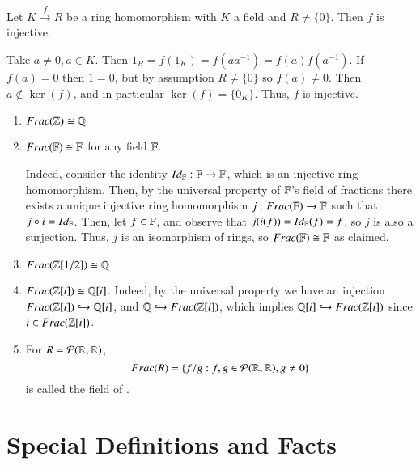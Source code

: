 \documentclass[12pt, a4paper, twoside, openright, titlepage]{book}
\begin{document}
\begin{lem}{}{}
    Let $K\xrightarrow{f} R$ be a ring homomorphism with $K$ a field and $R \neq \{0\}$. Then $f$ is injective.
    \begin{proof*}{}{}
        Take $a \neq 0, a \in K$. Then $1_R = f(1_K) = f(aa^{-1}) = f(a)f(a^{-1})$. If $f(a) = 0$ then $1 = 0$, but by assumption $R \neq \{0\}$ so $f(a) \neq 0$. Then $a \notin \ker(f)$, and in particular $\ker(f) = \{0_K\}$. Thus, $f$ is injective.
    \end{proof*}
\end{lem}

\begin{eg}{}{}
    \leavevmode
    \begin{enumerate}
        \item $Frac(\mathbb Z) \cong \mathbb Q$
        \item $Frac(\mathbb F) \cong \mathbb F$ for any field $\mathbb F$.
        \begin{proof*}{}{}
            Indeed, consider the identity $Id_{\mathbb F}:\mathbb F\rightarrow \mathbb F$, which is an injective ring homomorphism. Then, by the universal property of $\mathbb F$'s field of fractions there exists a unique injective ring homomorphism $j:Frac(\mathbb F) \rightarrow \mathbb F$ such that $j \circ i = Id_{\mathbb F}$. Then, let $f \in \mathbb F$, and observe that $j(i(f)) = Id_{\mathbb F}(f) = f$, so $j$ is also a surjection. Thus, $j$ is an isomorphism of rings, so $Frac(\mathbb F) \cong \mathbb F$ as claimed.
        \end{proof*}
        \item $Frac(\mathbb Z[1/2]) \cong \mathbb Q$
        \item $Frac(\mathbb Z[i]) \cong \mathbb Q[i]$. Indeed, by the universal property we have an injection $Frac(\mathbb Z[i])\hookrightarrow \mathbb Q[i]$, and $\mathbb Q \hookrightarrow Frac(\mathbb Z[i])$, which implies $\mathbb Q[i] \hookrightarrow Frac(\mathbb Z[i])$ since $i \in Frac(\mathbb Z[i])$.
        \item For $R = \mathcal{P}(\mathbb R,\mathbb R)$, \begin{equation}
            Frac(R) = \{f/g: f,g \in \mathcal{P}(\mathbb R,\mathbb R), g \neq 0\}
        \end{equation}
        is called the field of .
    \end{enumerate}
\end{eg}


\section{\textsection Special Definitions and Facts}
\end{document}
